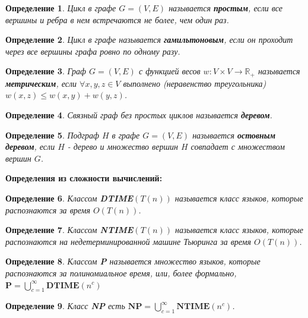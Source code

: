 \documentclass[14pt]{article}
\newtheorem{Def}{Определение}
\begin{document}
		\begin{Def}
			Цикл в графе $G = (V, E)$ называется \textbf{простым}, если все вершины и ребра в нем встречаются не более, чем один раз.
		\end{Def}

		
		\begin{Def}
			Цикл в графе называется \textbf{гамильтоновым}, если он проходит через все вершины графа ровно по одному разу.
		\end{Def}
		
		\begin{Def}
			Граф $G = (V, E)$ с функцией весов $w : V \times V \rightarrow \mathbb{R}_+$ называется \textbf{метрическим}, если $\forall x,y,z \in V $ выполнено (неравенство треугольника) $ w(x, z) \leq w(x, y) + w(y, z)$.
	
		\end{Def}
		
		\begin{Def} 
			Связный граф без простых циклов называется \textbf{деревом}.
		\end{Def}

		\begin{Def}
			Подграф $H$ в графе $G = (V, E)$ называется \textbf{остовным деревом}, если $H$ - дерево и множество вершин $H$ совпадает с множеством вершин $G$.	
		\end{Def}
		
		\begin{center}
			\textbf{\large Определения из сложности вычислений:}
		\end{center}
		
		\begin{Def}
			Классом \textbf{DTIME}$(T(n))$ называется класс языков, которые распознаются за время $O(T(n))$.	
		\end{Def}
		
		\begin{Def}
			Классом \textbf{NTIME}$(T(n))$ называется класс языков, которые распознаются на недетерминированной машине Тьюринга за время $O(T(n))$.	
		\end{Def}

		
		\begin{Def}
			Классом \textbf{P} называется множество языков, которые распознаются за полиномиальное время, или, более формально, $\textbf{P} = \bigcup_{c=1}^\infty \textbf{DTIME}(n^c)$	
		\end{Def}

		\begin{Def}
			Класс \textbf{NP} есть 	$\textbf{NP} = \bigcup_{c=1}^\infty \textbf{NTIME}(n^c)$.
		\end{Def}
\end{document}

